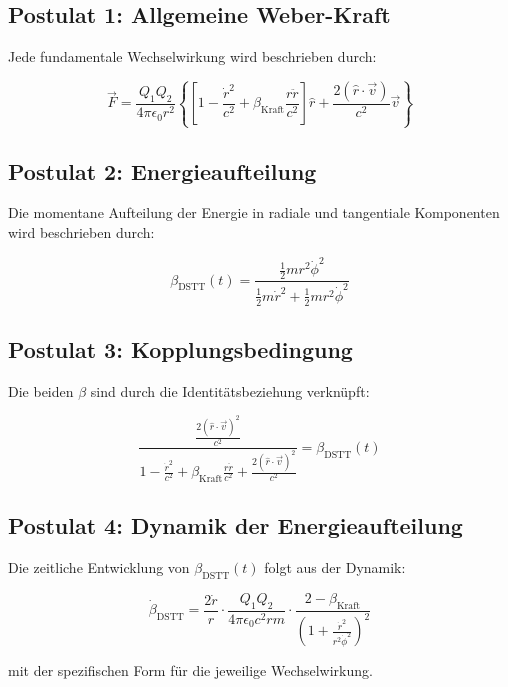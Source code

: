 \documentclass[12pt,a4paper]{article}
\begin{document}
\subsection*{Postulat 1: Allgemeine Weber-Kraft}
Jede fundamentale Wechselwirkung wird beschrieben durch:

\begin{equation}
\vec{F} = \frac{Q_1 Q_2}{4\pi\epsilon_0 r^2} \left\{ \left[1 - \frac{\dot{r}^2}{c^2} + \beta_{\text{Kraft}}\frac{r\ddot{r}}{c^2}\right] \hat{r} + \frac{2(\hat{r}\cdot\vec{v})}{c^2}\vec{v} \right\}
\end{equation}

\subsection*{Postulat 2: Energieaufteilung}
Die momentane Aufteilung der Energie in radiale und tangentiale Komponenten wird beschrieben durch:

\begin{equation}
\beta_{\text{DSTT}}(t) = \frac{\frac{1}{2}m r^2\dot{\phi}^2}{\frac{1}{2}m\dot{r}^2 + \frac{1}{2}m r^2\dot{\phi}^2}
\end{equation}

\subsection*{Postulat 3: Kopplungsbedingung}
Die beiden \(\beta\) sind durch die Identitätsbeziehung verknüpft:

\begin{equation}
\frac{\frac{2(\hat{r}\cdot\vec{v})^2}{c^2}}{1 - \frac{\dot{r}^2}{c^2} + \beta_{\text{Kraft}}\frac{r\ddot{r}}{c^2} + \frac{2(\hat{r}\cdot\vec{v})^2}{c^2}} = \beta_{\text{DSTT}}(t)
\end{equation}

\subsection*{Postulat 4: Dynamik der Energieaufteilung}
Die zeitliche Entwicklung von \(\beta_{\text{DSTT}}(t)\) folgt aus der Dynamik:

\begin{equation}
\dot{\beta}_{\text{DSTT}} = \frac{2\dot{r}}{r} \cdot \frac{Q_1 Q_2}{4\pi\epsilon_0 c^2 r m} \cdot \frac{2 - \beta_{\text{Kraft}}}{\left(1 + \frac{\dot{r}^2}{r^2\dot{\phi}^2}\right)^2}
\end{equation}

mit der spezifischen Form für die jeweilige Wechselwirkung.
\end{document}
